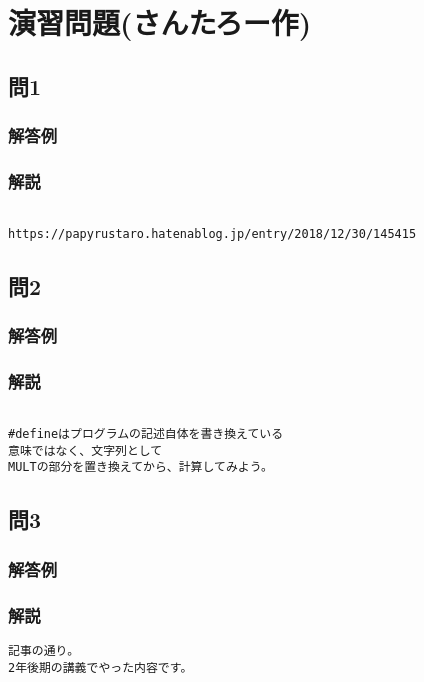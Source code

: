 \section{演習問題(さんたろー作)}
\subsection{問1}
\subsubsection{解答例}

\subsubsection{解説}
\begin{verbatim}

https://papyrustaro.hatenablog.jp/entry/2018/12/30/145415
\end{verbatim}

\subsection{問2}
\subsubsection{解答例}

\subsubsection{解説}
\begin{verbatim}

#defineはプログラムの記述自体を書き換えている
意味ではなく、文字列として
MULTの部分を置き換えてから、計算してみよう。
\end{verbatim}

\subsection{問3}
\subsubsection{解答例}

\subsubsection{解説}
\begin{verbatim}
記事の通り。
2年後期の講義でやった内容です。
\end{verbatim}
